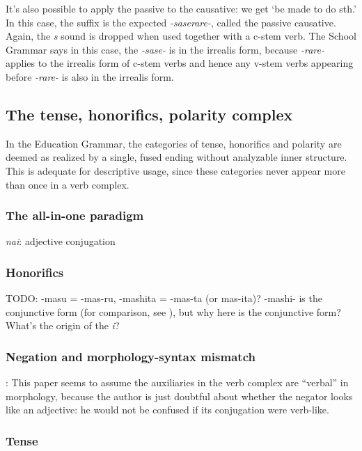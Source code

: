 \documentclass[UTF8, a4paper, oneside, scheme=plain]{ctexart}
\newcommand*{\citepage}[1]{pp.~{#1}}
\newcommand{\corpus}[1]{\emph{#1}}
\newcommand{\translate}[1]{`#1'}
\begin{document}
It's also possible to apply the passive to the causative:
we get \translate{be made to do sth.}
In this case, the suffix is the expected 
\corpus{-saserare-},
called the passive causative.
Again, the \corpus{s} sound is dropped when used together with a c-stem verb.
The School Grammar says in this case,
the \corpus{-sase-} is in the irrealis form,
because \corpus{-rare-} applies to the irrealis form of c-stem verbs 
and hence any v-stem verbs appearing before \corpus{-rare-} is also in the irrealis form.

\subsection{The tense, honorifics, polarity complex}

In the Education Grammar,
the categories of tense, honorifics and polarity 
are deemed as realized by a single, fused ending without analyzable inner structure.
This is adequate for descriptive usage,
since these categories never appear more than once in a verb complex.

\subsubsection{The all-in-one paradigm}



\corpus{nai}: adjective conjugation

\subsubsection{Honorifics}

TODO: -masu = -mas-ru, -mashita = -mas-ta (or mas-ita)?
-mashi- is the conjunctive form (for comparison, see \citet[\citepage{99}]{akiyama2012japanese}), but why here is the conjunctive form?
What's the origin of the \corpus{i}?

\subsubsection{Negation and morphology-syntax mismatch}

\citet{spencer2008negation}: This paper seems to assume the auxiliaries in the verb complex 
are ``verbal'' in morphology,
because the author is just doubtful about whether the negator looks like an adjective:
he would not be confused if its conjugation were verb-like.

\subsubsection{Tense}
\end{document}
